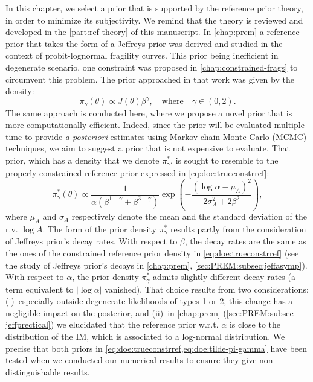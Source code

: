 In this chapter, we select a prior that is supported by the reference prior theory, in order to minimize its subjectivity.
We remind that the theory is reviewed and developed in the \cref{part:ref-theory} of this manuscript. %
In \cref{chap:prem} a reference prior that takes the form of a Jeffreys prior was derived and studied in the context of probit-lognormal fragility curves.
This prior being inefficient in degenerate scenario, one constraint was proposed in \cref{chap:constrained-frags} to circumvent this problem.
The prior approached in that work was given by the density:
    \begin{equation}\label{eq:doe:trueconstrref}
        \pi_\gamma(\theta)\propto J(\theta)\beta^\gamma,\quad\text{where}\quad \gamma\in(0,2).
    \end{equation}
The same approach is conducted here, where we propose a novel prior that is more computationally efficient. Indeed, since the prior will be evaluated multiple time to provide \emph{a posteriori} estimates using Markov chain Monte Carlo (MCMC) techniques, we aim to suggest a prior that is not expensive to evaluate.
That prior, which has a density that we denote $\pi^\ast_\gamma$, is sought to resemble to the properly constrained reference prior expressed in \cref{eq:doe:trueconstrref}:
    \begin{equation}\label{eq:doe:tilde-pi-gamma}
        \pi^\ast_\gamma(\theta) \propto\frac{1}{\alpha(\beta^{1-\gamma}+\beta^{3-\gamma})}\exp\left(-\frac{(\log\alpha-\mu_A)^2}{2\sigma_A^2+2\beta^2}\right),
    \end{equation}
    where $\mu_A$ and $\sigma_A$ respectively denote the mean and the standard deviation of the r.v. $\log A$.
The form of the prior density $\pi^\ast_\gamma$ results partly from the consideration of Jeffreys prior's decay rates. With respect to $\beta$, the decay rates are the same as the ones of the constrained reference prior density in \cref{eq:doe:trueconstrref} (see the study of Jeffreys prior's decays in \cref{chap:prem}, \cref{sec:PREM:subsec:jeffasymp}). With respect to $\alpha$, the prior density $\pi^\ast_\gamma$ admits slightly different decay rates (a term equivalent to $|\log\alpha|$ vanished). That choice results from two considerations: (i)~especially outside degenerate likelihoods of types 1 or 2, this change has a negligible impact on the posterior, and (ii)~in \cref{chap:prem} (\cref{sec:PREM:subsec-jeffprectical}) we elucidated that the reference prior w.r.t. $\alpha$ is close to the distribution of the IM, which is associated to a log-normal distribution.
We precise that both priors in \cref{eq:doe:trueconstrref,eq:doe:tilde-pi-gamma} have been tested when we conducted our numerical results to ensure they give non-distinguishable results.

